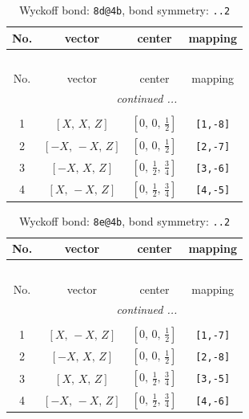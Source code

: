 \documentclass[fleqn,8pt]{jsarticle}
\begin{document}
\begin{longtable}{cccc}
\caption{Wyckoff bond: {\tt 8d@4b}, bond symmetry: {\tt ..2}}
 \\
 \hline \hline
No. & vector & center & mapping \\ \hline \endfirsthead

\multicolumn{3}{l}{\tablename\ \thetable{}} \\
 \hline \hline
No. & vector & center & mapping \\ \hline \endhead

 \hline \hline
\multicolumn{3}{r}{\footnotesize\it continued ...} \\ \endfoot

 \hline \hline
\multicolumn{3}{r}{} \\ \endlastfoot

1 & $\left[ X,\, X,\, Z \right]$ & $\left[ 0,\, 0,\, \frac{1}{2} \right]$ & {\tt [1,-8]} \\ \hline
2 & $\left[ - X,\, - X,\, Z \right]$ & $\left[ 0,\, 0,\, \frac{1}{2} \right]$ & {\tt [2,-7]} \\ \hline
3 & $\left[ - X,\, X,\, Z \right]$ & $\left[ 0,\, \frac{1}{2},\, \frac{3}{4} \right]$ & {\tt [3,-6]} \\ \hline
4 & $\left[ X,\, - X,\, Z \right]$ & $\left[ 0,\, \frac{1}{2},\, \frac{3}{4} \right]$ & {\tt [4,-5]} \\
\end{longtable}
\renewcommand{\arraystretch}{1.2}
\begin{longtable}{cccc}
\caption{Wyckoff bond: {\tt 8e@4b}, bond symmetry: {\tt ..2}}
 \\
 \hline \hline
No. & vector & center & mapping \\ \hline \endfirsthead

\multicolumn{3}{l}{\tablename\ \thetable{}} \\
 \hline \hline
No. & vector & center & mapping \\ \hline \endhead

 \hline \hline
\multicolumn{3}{r}{\footnotesize\it continued ...} \\ \endfoot

 \hline \hline
\multicolumn{3}{r}{} \\ \endlastfoot

1 & $\left[ X,\, - X,\, Z \right]$ & $\left[ 0,\, 0,\, \frac{1}{2} \right]$ & {\tt [1,-7]} \\ \hline
2 & $\left[ - X,\, X,\, Z \right]$ & $\left[ 0,\, 0,\, \frac{1}{2} \right]$ & {\tt [2,-8]} \\ \hline
3 & $\left[ X,\, X,\, Z \right]$ & $\left[ 0,\, \frac{1}{2},\, \frac{3}{4} \right]$ & {\tt [3,-5]} \\ \hline
4 & $\left[ - X,\, - X,\, Z \right]$ & $\left[ 0,\, \frac{1}{2},\, \frac{3}{4} \right]$ & {\tt [4,-6]} \\
\end{longtable}
\end{document}
